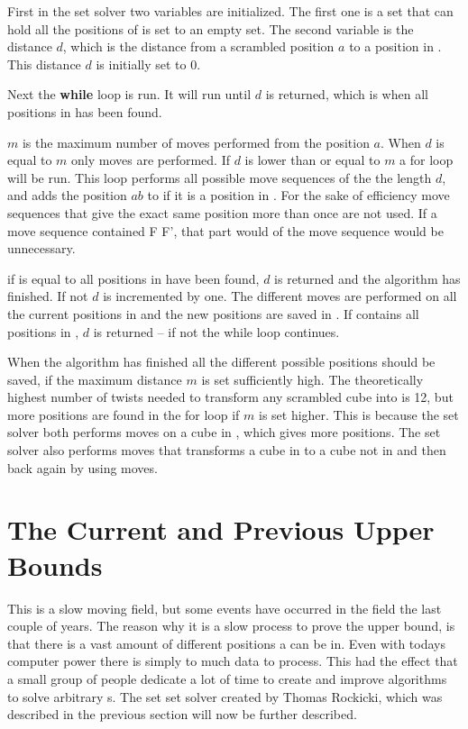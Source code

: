 First in the set solver two variables are initialized. The first one  is a set that can hold all the positions of  is set to an empty set. The second variable is the distance $d$, which is the distance from a scrambled position $a$ to a position in . This distance $d$ is initially set to $0$.

Next the \textbf{while} loop is run. It will run until $d$ is returned, which is when all positions in  has been found.

$m$ is the maximum number of  moves performed from the position $a$. When $d$ is equal to $m$ only  moves are performed.
If $d$ is lower than or equal to $m$ a for loop will be run. This loop performs all possible move sequences of the the length $d$, and adds the position $ab$ to  if it is a position in .%
For the sake of efficiency move sequences that give the exact same position more than once are not used. If a move sequence contained F F', that part would  of the move sequence would be unnecessary. 

if  is equal to  all positions in  have been found, $d$ is returned and the algorithm has finished. 
If not $d$ is incremented by one. 
The different  moves are performed on all the current  positions in  and the new  positions are saved in .
If  contains all positions in , $d$ is returned -- if not the while loop continues.


When the algorithm has finished all the different possible  positions should be saved, if the maximum distance $m$ is set sufficiently high. The theoretically highest number of twists needed to transform any scrambled cube into  is 12, but more positions are found in the for loop if $m$ is set higher. This is because the set solver both performs  moves on a cube in , which gives more  positions. The set solver also performs moves that transforms a cube in  to a cube not in  and then back again by using  moves.



\section{The Current and Previous Upper Bounds}
This is a slow moving field, but some events have occurred in the field the last couple of years.%
The reason why it is a slow process to prove the upper bound, is that there is a vast amount of different positions a \rubik{} can be in. Even with todays computer power there is simply to much data to process. This had the effect that a small group of people dedicate a lot of time to create and improve algorithms to solve arbitrary \rubik{}s. The set set solver created by Thomas Rockicki, which was described in the previous section will now be further described.

